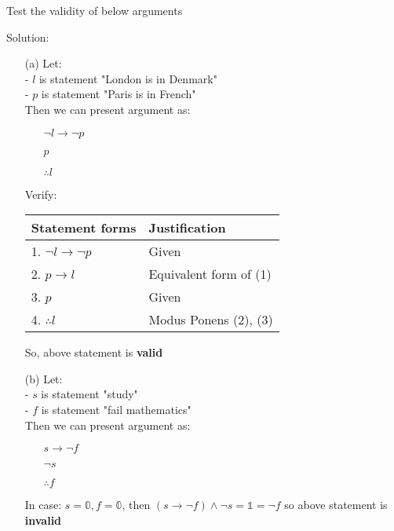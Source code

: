 \newpage
\begin{longfbox}
    \begin{bt} \label{pro:practice2.43}
        Test the validity of below arguments
    \end{bt}
\end{longfbox}
Solution:
\begin{enumerate}
    \item[(a)] Let: \\
        - $l$ is statement "London is in Denmark" \\
        - $p$ is statement "Paris is in French" \\
        Then we can present argument as:
        \begin{enumerate}
            \item[] $\neg l \rightarrow \neg p$
            \item[] $p$
            \item[] $\therefore l$
        \end{enumerate}
        Verify:
        \begin{table}[hbt!]
            \centering
            \begin{tabular}{|l | l|}
            \hline
            Statement forms & Justification\\ [0.5ex]
            \hline
                1. $\neg l \rightarrow \neg p$ & Given \\
                2. $p \rightarrow l$ & Equivalent form of (1) \\
                3. $p$ & Given \\
                4. $\therefore l$ & Modus Ponens (2), (3) \\
            \hline
            \end{tabular}
        \end{table}

        So, above statement is \textbf{valid}

    \item[(b)] Let: \\
        - $s$ is statement "study" \\
        - $f$ is statement "fail mathematics" \\
        Then we can present argument as:
        \begin{enumerate}
            \item[] $s \rightarrow \neg f$
            \item[] $\neg s$
            \item[] $\therefore f$
        \end{enumerate}
        In case: $s=\mathbb{0}, f=\mathbb{0}$, then $(s\rightarrow \neg f) \land \neg s = \mathbb{1} = \neg f$ so above statement is \textbf{invalid}


\end{enumerate}
